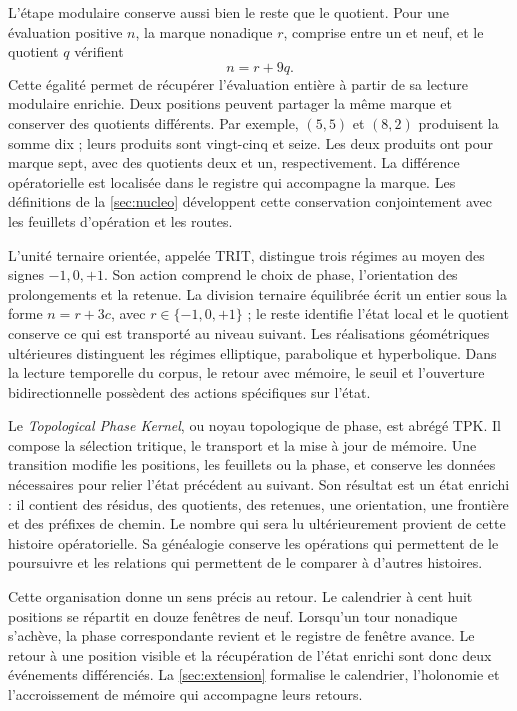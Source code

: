 L’étape modulaire conserve aussi bien le reste que le quotient. Pour une
évaluation positive \(n\), la marque nonadique \(r\), comprise entre
un et neuf, et le quotient \(q\) vérifient
\[
 n=r+9q.
\]
Cette égalité permet de récupérer l’évaluation entière à partir de sa lecture
modulaire enrichie. Deux positions peuvent partager la même marque et
conserver des quotients différents. Par exemple, \((5,5)\) et \((8,2)\)
produisent la somme dix ; leurs produits sont vingt-cinq et seize. Les deux
produits ont pour marque sept, avec des quotients deux et un, respectivement.
La différence opératorielle est localisée dans le registre qui accompagne
la marque. Les définitions de la \cref{sec:nucleo} développent cette
conservation conjointement avec les feuillets d’opération et les routes.

L’unité ternaire orientée, appelée TRIT, distingue trois régimes
au moyen des signes \(-1,0,+1\). Son action comprend le choix de phase,
l’orientation des prolongements et la retenue. La division ternaire
équilibrée écrit un entier sous la forme \(n=r+3c\), avec
\(r\in\{-1,0,+1\}\) ; le reste identifie l’état local et le
quotient conserve ce qui est transporté au niveau suivant. Les réalisations
géométriques ultérieures distinguent les régimes elliptique, parabolique et
hyperbolique. Dans la lecture temporelle du corpus, le retour avec mémoire,
le seuil et l’ouverture bidirectionnelle possèdent des actions spécifiques sur
l’état.

Le \emph{Topological Phase Kernel}, ou noyau topologique de phase, est abrégé TPK. Il compose la sélection tritique, le transport et la mise à jour de mémoire. Une transition modifie les positions, les feuillets ou la phase, et conserve les données nécessaires pour relier l'état précédent au suivant. Son résultat est un état enrichi : il contient des résidus, des quotients, des retenues, une orientation, une frontière et des préfixes de chemin. Le nombre qui sera lu ultérieurement provient de cette histoire opératorielle. Sa généalogie conserve les opérations qui permettent de le poursuivre et les relations qui permettent de le comparer à d'autres histoires.

Cette organisation donne un sens précis au retour. Le calendrier
à cent huit positions se répartit en douze fenêtres de neuf. Lorsqu’un
tour nonadique s’achève, la phase correspondante revient et le
registre de fenêtre avance. Le retour à une position visible et la
récupération de l’état enrichi sont donc deux événements
différenciés. La \cref{sec:extension} formalise le calendrier,
l’holonomie et l’accroissement de mémoire qui accompagne leurs retours.

